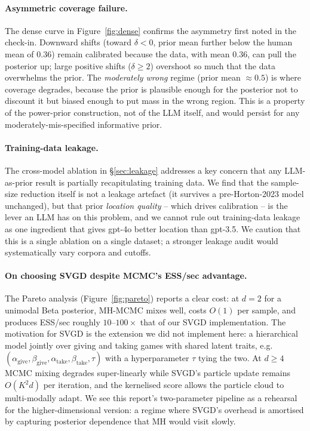 \documentclass[11pt]{article}
\begin{document}
\paragraph{Asymmetric coverage failure.}
The dense curve in Figure~\ref{fig:dense} confirms the asymmetry first noted in the check-in.
Downward shifts (toward $\delta < 0$, prior mean further below the human mean of $0.36$)
remain calibrated because the data, with mean $0.36$, can pull the posterior up; large
positive shifts ($\delta \ge 2$) overshoot so much that the data overwhelms the prior. The
\emph{moderately wrong} regime (prior mean $\approx 0.5$) is where coverage degrades, because
the prior is plausible enough for the posterior not to discount it but biased enough to put
mass in the wrong region. This is a property of the power-prior construction, not of the LLM
itself, and would persist for any moderately-mis-specified informative prior.

\paragraph{Training-data leakage.}
The cross-model ablation in \S\ref{sec:leakage} addresses a key concern that any
LLM-as-prior result is partially recapitulating training data. We find
that the sample-size reduction itself is not a leakage artefact (it survives a
pre-Horton-2023 model unchanged), but that prior \emph{location quality} -- which drives
calibration -- is the lever an LLM has on this problem, and we cannot rule out training-data
leakage as one ingredient that gives gpt-4o better location than gpt-3.5. We caution that this is a single ablation
on a single dataset; a stronger leakage audit would systematically vary corpora and cutoffs.

\paragraph{On choosing SVGD despite MCMC's ESS/sec advantage.}
The Pareto analysis (Figure~\ref{fig:pareto}) reports a clear cost: at $d = 2$ for a unimodal
Beta posterior, MH-MCMC mixes well, costs $O(1)$ per sample, and produces ESS/sec roughly
$10$--$100\times$ that of our SVGD implementation. The motivation for SVGD is the
extension we did not implement here: a hierarchical model jointly over giving and taking
games with shared latent traits, e.g.\ $(\alpha_{\mathrm{give}}, \beta_{\mathrm{give}},
\alpha_{\mathrm{take}}, \beta_{\mathrm{take}}, \tau)$ with a hyperparameter $\tau$ tying
the two. At $d \ge 4$ MCMC mixing degrades super-linearly while SVGD's particle update
remains $O(K^2 d)$ per iteration, and the kernelised score allows the particle cloud to
multi-modally adapt. We see this report's two-parameter pipeline as a rehearsal for the
higher-dimensional version: a regime where SVGD's overhead is amortised by capturing
posterior dependence that MH would visit slowly.
\end{document}
